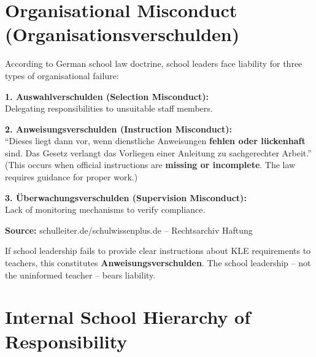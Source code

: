 \documentclass[11pt,a4paper]{article}
\begin{document}
\section{Organisational Misconduct (Organisationsverschulden)}

\begin{sourcebox}
According to German school law doctrine, school leaders face liability for three types of organisational failure:

\textbf{1. Auswahlverschulden (Selection Misconduct):}\\
Delegating responsibilities to unsuitable staff members.

\textbf{2. Anweisungsverschulden (Instruction Misconduct):}\\
``Dieses liegt dann vor, wenn dienstliche Anweisungen \textbf{fehlen oder lückenhaft} sind. Das Gesetz verlangt das Vorliegen einer Anleitung zu sachgerechter Arbeit.''\\
(This occurs when official instructions are \textbf{missing or incomplete}. The law requires guidance for proper work.)

\textbf{3. Überwachungsverschulden (Supervision Misconduct):}\\
Lack of monitoring mechanisms to verify compliance.

\textbf{Source:} schulleiter.de/schulwissenplus.de -- Rechtsarchiv Haftung
\end{sourcebox}

\begin{warningbox}
If school leadership fails to provide clear instructions about KLE requirements to teachers, this constitutes \textbf{Anweisungsverschulden}. The school leadership -- not the uninformed teacher -- bears liability.
\end{warningbox}

\section{Internal School Hierarchy of Responsibility}
\end{document}
